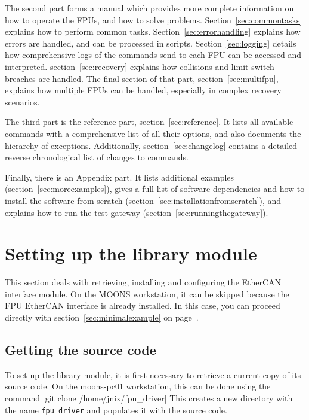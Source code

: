 \documentclass[11pt,a4paper]{report}
\begin{document}
The second part forms a manual which provides more complete
information on how to operate the FPUs, and how to solve
problems. Section~\ref{sec:commontasks} explains how to perform common
tasks. Section~\ref{sec:errorhandling} explains how errors are
handled, and can be processed in scripts. Section~\ref{sec:logging}
details how comprehensive logs of the commands send to each FPU can be
accessed and interpreted. section~\ref{sec:recovery} explains how
collisions and limit switch breaches are handled. The final section
of that part, section~\ref{sec:multifpu}, explains how multiple FPUs
can be handled, especially in complex recovery scenarios.

The third part is the reference part, section~\ref{sec:reference}.
It lists all available commands with a comprehensive list of all their
options, and also documents the hierarchy of exceptions.
Additionally, section~\ref{sec:changelog} contains a detailed reverse
chronological list of changes to commands.

Finally, there is an Appendix part. It lists additional examples
(section~\ref{sec:moreexamples}), gives a full list of software
dependencies and how to install the software from scratch
(section~\ref{sec:installationfromscratch}), and explains how to run
the test gateway (section~\ref{sec:runningthegateway}).

\section{Setting up the library module}
\label{sec:settingup}

This section deals with retrieving, installing and configuring the
EtherCAN interface module. On the MOONS workstation, it can be skipped because the
FPU EtherCAN interface is already installed.  In this case, you can proceed
directly with section~\ref{sec:minimalexample} on
page~\pageref{sec:minimalexample}.

\subsection{Getting the source code}

To set up the library module, it is first
necessary to retrieve a current copy of its source code.
On the moons-pc01 workstation, this can be done using the
command |git clone /home/jnix/fpu_driver|
This creates a new directory with the name \texttt{fpu\_driver}
and populates it with the source code.
\end{document}
